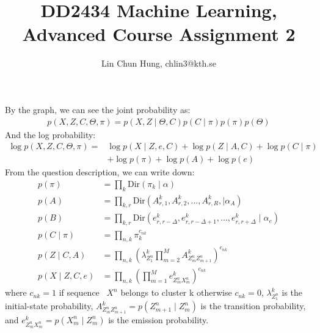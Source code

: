 \documentclass[12pt]{article}
\newenvironment{problem}[2][Problem]{\begin{trivlist}
\item[\hskip \labelsep {\bfseries #1}\hskip \labelsep {\bfseries #2.}]}{\end{trivlist}}
\begin{document}
 
 
\title{DD2434 Machine Learning, Advanced Course Assignment 2}
\author{Lin Chun Hung, chlin3@kth.se}
\maketitle

\begin{problem}{2.8.24}
By the graph, we can see the joint probability as:
\begin{align*}
    p(X, Z, C, \Theta, \pi) = p(X, Z \mid \Theta, C) p(C\mid \pi) p(\pi) p(\Theta)
\end{align*}
And the log probability:
\begin{align*}
    \log p(X, Z, C, \Theta, \pi) = 
    &\log p(X \mid Z, e, C) + \log p(Z \mid A, C) + \log p(C\mid \pi)  \\
    & + \log p(\pi) + \log p(A)  + \log p(e)
\end{align*}
From the question description, we can write down:
\begin{align*}
    p(\pi) &= \prod_{k} \mathrm{Dir}(\pi_k\mid \alpha) \\
    p(A) &= \prod_{k,r} \mathrm{Dir}(A^k_{r,1}, A^k_{r,2}, ..., A^k_{r,R},\mid \alpha_A) \\
    p(B) &= \prod_{k,r} \mathrm{Dir}(e^k_{r,r-\Delta}, e^k_{r,r-\Delta +1}, ..., e^k_{r,r+\Delta}\mid \alpha_e) \\
    p(C\mid \pi) &= \prod_{n,k} \pi_k^{c_{nk}} \\
    p(Z\mid C, A) &= \prod_{n,k}(\lambda^k_{Z^n_{1}}
        \prod_{m=2}^{M} A^k_{Z^n_{m}Z^n_{m+1}})^{c_{nk}} \\
    p(X\mid Z, C, e) &= \prod_{n,k} (\prod_{m=1}^{M} e^k_{Z^n_{m}X^n_{m}})^{c_{nk}}
\end{align*}
where $c_{nk}=1$ if sequence ~$X^n$ belongs to cluster k otherwise $c_{nk}=0$,
      $\lambda^k_{Z^n_{1}}$ is the initial-state probability,
      $A^k_{Z^n_{m}Z^n_{m+1}} = p(Z^n_{m+1}\mid Z^n_{m})$ is the transition probability,
  and $e^k_{Z^n_{m}X^n_{m}} = p(X^n_{m}\mid Z^n_{m})$ is the emission probability.


\end{problem}
\end{document}
